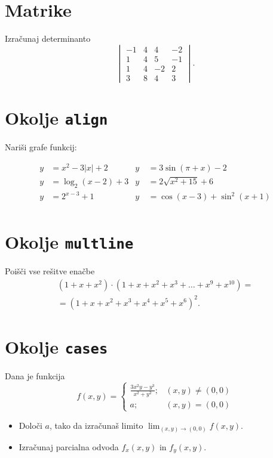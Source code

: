 \documentclass[a4paper,12pt]{article}
\begin{document}
\section*{Matrike}
Izračunaj determinanto
\[
\begin{vmatrix}
   -1 & 4 & 4 & -2 \\
   1 & 4 & 5 & -1 \\
   1 & 4 & -2 & 2 \\
   3 & 8 & 4 & 3
\end{vmatrix}.
\]

\section*{Okolje \texttt{align}}
Nariši grafe funkcij:

\begin{align*}
   y &= x^2 - 3|x| + 2   & y~&= 3 \sin(\pi+x) - 2\\
   y &= \log_2(x-2) + 3  & y~&= 2 \sqrt{x^2+15} + 6\\
   y &= 2^{x-3} + 1      & y~&= \cos(x-3) + \sin^2(x+1)\\
\end{align*}

\section*{Okolje \texttt{multline}}
Poišči vse rešitve enačbe
\begin{multline}
(1+x+x^2) \cdot (1+x+x^2+x^3+\ldots+x^9+x^{10}) =\\
=(1+x+x^2+x^3+x^4+x^5+x^6)^2.
\end{multline}

\section*{Okolje \texttt{cases}}
Dana je funkcija
\[
f(x,y) =
\begin{cases}
      \frac{3x^2y-y^3}{x^2+y^2}; & (x,y) \neq (0,0)\\
      a; & (x,y) = (0,0)
\end{cases}
\]
\begin{itemize}
\item Določi \(a\), tako da izračunaš limito \( \lim_{(x,y)\to(0,0)} f(x,y) \).
\item Izračunaj parcialna odvoda \(f_x(x,y)\) in \(f_y(x,y)\).
\end{itemize}
\end{document}
